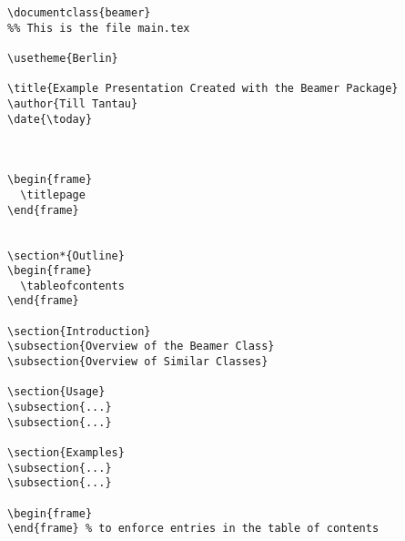 \begin{verbatim}
\documentclass{beamer}
%% This is the file main.tex

\usetheme{Berlin}

\title{Example Presentation Created with the Beamer Package}
\author{Till Tantau}
\date{\today}



\begin{frame}
  \titlepage
\end{frame}


\section*{Outline}
\begin{frame}
  \tableofcontents
\end{frame}

\section{Introduction}
\subsection{Overview of the Beamer Class}
\subsection{Overview of Similar Classes}

\section{Usage}
\subsection{...}
\subsection{...}

\section{Examples}
\subsection{...}
\subsection{...}

\begin{frame}
\end{frame} % to enforce entries in the table of contents


\end{verbatim}

